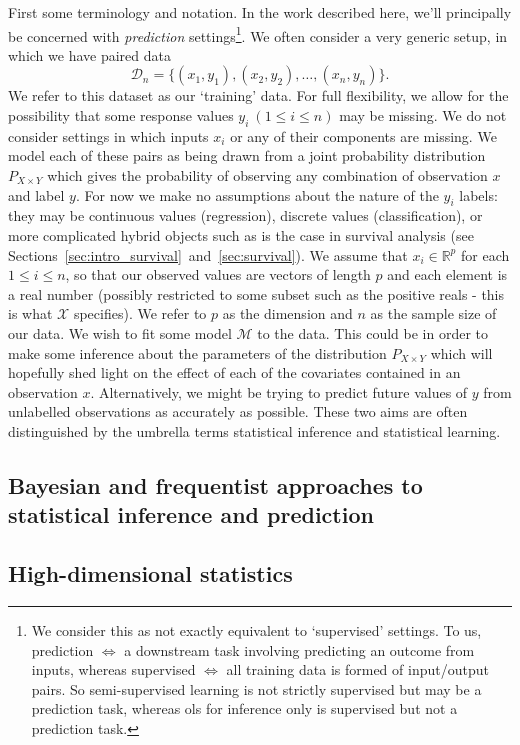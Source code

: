 \documentclass[thesis.tex]{subfiles}
\begin{document}
First some terminology and notation. In the work described here, we'll principally be concerned with \emph{prediction} settings\footnote{We consider this as not exactly equivalent to `supervised' settings. To us, prediction $\Leftrightarrow$ a downstream task involving predicting an outcome from inputs, whereas supervised $\Leftrightarrow$ all training data is formed of input/output pairs. So semi-supervised learning is not strictly supervised but may be a prediction task, whereas \gls{ols} for inference only is supervised but not a prediction task.}. We often consider a very generic setup, in which we have paired data
\[\mathcal{D}_n = \{(x_1, y_1), (x_2, y_2), \dots, (x_n, y_n)\}.\] 
We refer to this dataset as our `training' data. For full flexibility, we allow for the possibility that some response values $y_i \ (1 \leq i \leq n)$ may be missing. We do not consider settings in which inputs $x_i$ or any of their components are missing. We model each of these pairs as being drawn from a joint probability distribution $P_{X \times Y}$ which gives the probability of observing any combination of observation $x$ and label $y$. For now we make no assumptions about the nature of the $y_i$ labels: they may be continuous values (regression), discrete values (classification), or more complicated hybrid objects such as is the case in survival analysis (see Sections~\ref{sec:intro_survival}~and~\ref{sec:survival}). We assume that $x_i \in \mathbb{R}^p$ for each $1 \leq i \leq n$, so that our observed values are vectors of length $p$ and each element is a real number (possibly restricted to some subset such as the positive reals - this is what $\mathcal{X}$ specifies). We refer to $p$ as the dimension and $n$ as the sample size of our data. We wish to fit some model $\mathcal{M}$ to the data. This could be in order to make some inference about the parameters of the distribution $P_{X \times Y}$ which will hopefully shed light on the effect of each of the covariates contained in an observation $x$. Alternatively, we might be trying to predict future values of $y$ from unlabelled observations as accurately as possible. These two aims are often distinguished by the umbrella terms statistical inference and statistical learning.


\subsection{Bayesian and frequentist approaches to statistical inference and prediction}

\subsection{High-dimensional statistics}
\end{document}

